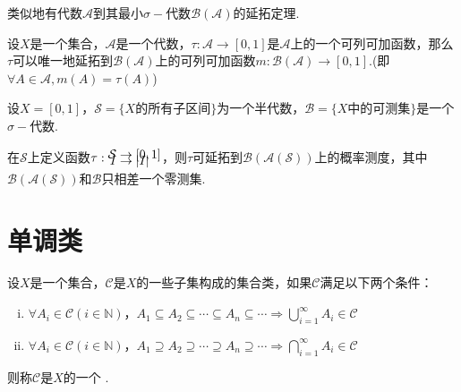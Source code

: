 类似地有代数$\mathcal{A}$到其最小$\sigma-\!\!$代数$\mathcal{B}(\mathcal{A})$的延拓定理.
\begin{theorem}
    设$X$是一个集合，$\mathcal{A}$是一个代数，$\tau:\mathcal{A}\to[0,1]$是$\mathcal{A}$上的一个可列可加函数，那么$\tau$可以唯一地延拓到$\mathcal{B}(\mathcal{A})$上的可列可加函数$m:\mathcal{B}(\mathcal{A})\to[0,1]$.(即$\forall A\in\mathcal{A},m(A)=\tau(A)$)
\end{theorem}
\begin{instance}
    设$X=[0,1]$，$\mathcal{S}=\{X\text{的所有子区间}\}$为一个半代数，$\mathcal{B}=\{X\text{中的可测集}\}$是一个$\sigma-\!\!$代数.\par
    在$\mathcal{S}$上定义函数$\tau:{\setjot[-7]\begin{aligned}
        \mathcal{S}&\to[0,1]\\
        I&\to|I|
    \end{aligned}}$，则$\tau$可延拓到$\mathcal{B}\left(\mathcal{A}(\mathcal{S})\right)$上的概率测度，其中$\mathcal{B}\left(\mathcal{A}(\mathcal{S})\right)$和$\mathcal{B}$只相差一个零测集.
\end{instance}


\section{单调类}

\begin{definition}
    设$X$是一个集合，$\mathcal{C}$是$X$的一些子集构成的集合类，如果$\mathcal{C}$满足以下两个条件：
    \begin{enumerate}[(i)]
        \item $\forall A_i\in\mathcal{C}(i\in\mathbb{N})$，$A_1\subseteq A_2\subseteq \cdots\subseteq A_n\subseteq\cdots\Rightarrow \bigcup_{i=1}^\infty{A_i}\in\mathcal{C}$
        \item $\forall A_i\in\mathcal{C}(i\in\mathbb{N})$，$A_1\supseteq A_2\supseteq\cdots\supseteq A_n\supseteq\cdots\Rightarrow\bigcap_{i=1}^\infty A_i\in\mathcal{C}$
    \end{enumerate}
    则称$\mathcal{C}$是$X$的一个 .
\end{definition}

